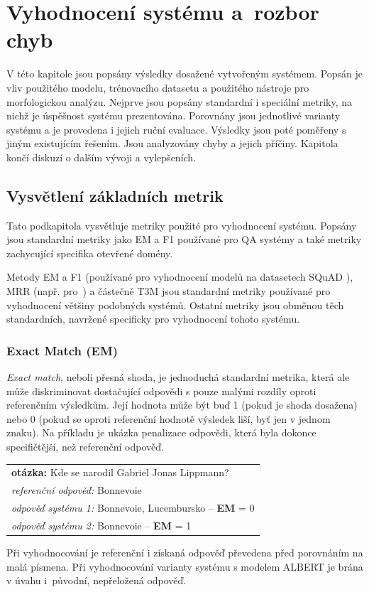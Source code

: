 
\chapter{Vyhodnocení systému a~rozbor chyb}
\label{system_evaluation}
V této kapitole jsou popsány výsledky dosažené vytvořeným systémem. Popsán je vliv použitého modelu, trénovacího datasetu a použitého nástroje pro morfologickou analýzu. Nejprve jsou popsány standardní i speciální metriky, na nichž je úspěšnost systému prezentována. Porovnány jsou jednotlivé varianty systému a je provedena i jejich ruční evaluace. Výsledky jsou poté poměřeny s jiným existujícím řešením. Jsou analyzovány chyby a jejich příčiny. Kapitola končí diskuzí o dalším vývoji a vylepšeních.


\section{Vysvětlení základních metrik}
\label{metriky}
Tato podkapitola vysvětluje metriky použité pro vyhodnocení systému. Popsány jsou standardní metriky jako EM a F1 používané pro QA systémy a také metriky zachycující specifika otevřené domény.\par
Metody EM a F1 (používané pro vyhodnocení modelů na datasetech SQuAD \cite{squad}\cite{squad_v2}), MRR (např. pro~\cite{sqad}) a částečně T3M jsou standardní metriky používané pro vyhodnocení většiny podobných systémů. Ostatní metriky jsou obměnou těch standardních, navržené specificky pro vyhodnocení tohoto systému.

\subsection{Exact Match (EM)}
\label{EM}
\emph{Exact match}, neboli přesná shoda, je jednoduchá standardní metrika, která ale může diskriminovat dostačující odpovědi s pouze malými rozdíly oproti referenčním výsledkům. Její hodnota může být buď 1 (pokud je shoda dosažena) nebo 0 (pokud se oproti referenční hodnotě výsledek liší, byť jen v jednom znaku). Na příkladu je ukázka penalizace odpovědi, která byla dokonce specifičtější, než referenční odpověď.\par
\begin{center}
\begin{tabular}{l}
    \textbf{otázka:} Kde se narodil Gabriel Jonas Lippmann?\\
    \emph{referenční odpověď:} Bonnevoie\\
    \emph{odpověď systému 1:} Bonnevoie, Lucembursko -- \textbf{EM} = 0\\
    \emph{odpověď systému 2:} Bonnevoie -- \textbf{EM} = 1
\end{tabular}
\end{center}
Při vyhodnocování je referenční i získaná odpověď převedena před porovnáním na malá písmena. Při vyhodnocování varianty systému s modelem ALBERT je brána v úvahu i~původní, nepřeložená odpověď.

